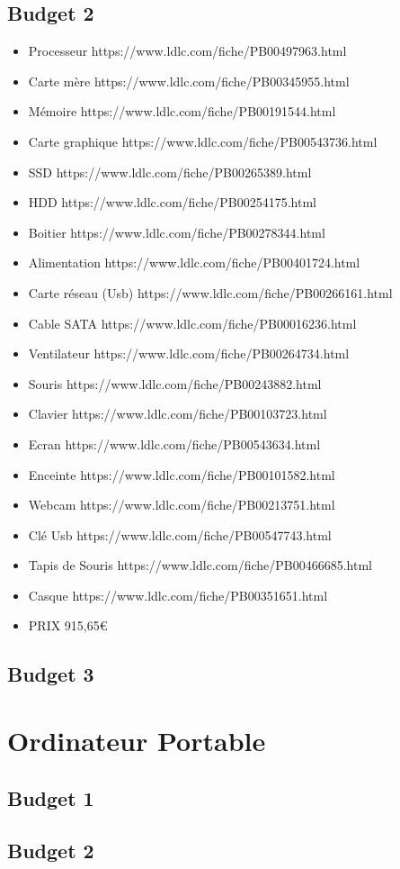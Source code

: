 \subsection{Budget 2}

\begin{itemize}
	\item Processeur https://www.ldlc.com/fiche/PB00497963.html
	\item Carte mère https://www.ldlc.com/fiche/PB00345955.html
	\item Mémoire https://www.ldlc.com/fiche/PB00191544.html
	\item Carte graphique https://www.ldlc.com/fiche/PB00543736.html 
	\item SSD https://www.ldlc.com/fiche/PB00265389.html
	\item HDD https://www.ldlc.com/fiche/PB00254175.html
	\item Boitier https://www.ldlc.com/fiche/PB00278344.html
	\item Alimentation https://www.ldlc.com/fiche/PB00401724.html
	\item Carte réseau (Usb) https://www.ldlc.com/fiche/PB00266161.html
	\item Cable SATA https://www.ldlc.com/fiche/PB00016236.html
	\item Ventilateur https://www.ldlc.com/fiche/PB00264734.html
	\item Souris https://www.ldlc.com/fiche/PB00243882.html
	\item Clavier https://www.ldlc.com/fiche/PB00103723.html
	\item Ecran https://www.ldlc.com/fiche/PB00543634.html
	\item Enceinte https://www.ldlc.com/fiche/PB00101582.html
	\item Webcam https://www.ldlc.com/fiche/PB00213751.html
	\item Clé Usb https://www.ldlc.com/fiche/PB00547743.html
	\item Tapis de Souris https://www.ldlc.com/fiche/PB00466685.html
	\item Casque https://www.ldlc.com/fiche/PB00351651.html
	\item PRIX 915,65\euro 
\end{itemize}

\subsection{Budget 3}

\section{Ordinateur Portable}

\subsection{Budget 1}


\subsection{Budget 2}